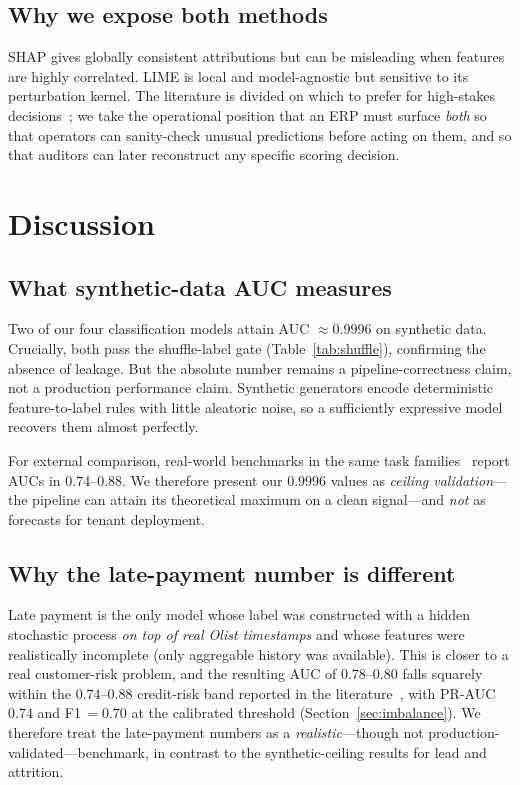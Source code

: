 \documentclass[conference]{IEEEtran}
\begin{document}
\subsection{Why we expose both methods}

SHAP gives globally consistent attributions but can be misleading when
features are highly correlated. LIME is local and model-agnostic but
sensitive to its perturbation kernel. The literature is divided on which to
prefer for high-stakes decisions~\cite{rudin2019stop,doshi2017towards}; we
take the operational position that an ERP must surface \emph{both} so that
operators can sanity-check unusual predictions before acting on them, and
so that auditors can later reconstruct any specific scoring decision.

\section{Discussion}
\label{sec:discussion}

\subsection{What synthetic-data AUC measures}

Two of our four classification models attain AUC $\approx 0.9996$ on
synthetic data. Crucially, both pass the shuffle-label gate
(Table~\ref{tab:shuffle}), confirming the absence of leakage. But the
absolute number remains a pipeline-correctness claim, not a production
performance claim. Synthetic generators encode deterministic feature-to-label
rules with little aleatoric noise, so a sufficiently expressive model
recovers them almost perfectly.

For external comparison, real-world benchmarks in the same task
families~\cite{lessmann2015benchmarking, sakar2019machinelearning} report AUCs
in $0.74$--$0.88$. We therefore present our $0.9996$ values as
\emph{ceiling validation}---the pipeline can attain its theoretical maximum
on a clean signal---and \emph{not} as forecasts for tenant deployment.

\subsection{Why the late-payment number is different}

Late payment is the only model whose label was constructed with a hidden
stochastic process \emph{on top of real Olist timestamps} and whose
features were realistically incomplete (only aggregable history was
available). This is closer to a real customer-risk problem, and the
resulting AUC of $0.78$--$0.80$ falls squarely within the $0.74$--$0.88$
credit-risk band reported in the
literature~\cite{lessmann2015benchmarking}, with PR-AUC $0.74$ and F1\,$=\!0.70$
at the calibrated threshold (Section~\ref{sec:imbalance}). We therefore
treat the late-payment numbers as a \emph{realistic}---though not
production-validated---benchmark, in contrast to the synthetic-ceiling
results for lead and attrition.
\end{document}
